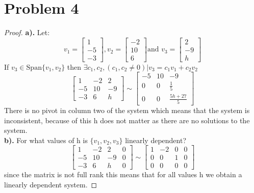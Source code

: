 \documentclass[12pt,a4paper]{article}
\begin{document}
\section*{Problem 4}
\begin{proof}
  \textbf{a).}
  Let:
  \[
    v_1=\begin{bmatrix}
      1\\-5\\-3
    \end{bmatrix},
    v_2=\begin{bmatrix}
      -2\\10\\6
  \end{bmatrix}
  \text{and }v_3=\begin{bmatrix}
    2\\-9\\h
  \end{bmatrix}
  \]
  If $v_3 \in \text{Span}\{v_1,v_2\}$ then $\exists c_1,c_2, (c_1,c_2 \neq 0) | v_3=c_1v_1+c_2v_2$
  \[
    \begin{bmatrix}
      1 & -2 & 2 \\-5 & 10 & -9\\ -3 & 6 & h
    \end{bmatrix}
    \sim \begin{bmatrix}-5&10&-9\\ 0&0&\frac{1}{5}\\ 0&0&\frac{5h+27}{5}\end{bmatrix}
  \]
  There is no pivot in column two of the system which means that the system is inconsistent, because of this h does not matter as there are no solutions to the system.\\
  \textbf{b).}
  For what values of h is $\{v_1,v_2,v_3\}$ linearly dependent?\\
  \[
  \begin{bmatrix}
    1 & -2 & 2&0 \\-5 & 10 & -9&0\\ -3 & 6 & h&0
  \end{bmatrix}
  \sim
  \begin{bmatrix}1&-2&0&0\\ 0&0&1&0\\ 0&0&0&0\end{bmatrix}
    \]
  since the matrix is not full rank this means that for all values h we  obtain a linearly dependent system.
\end{proof}\\
\end{document}
